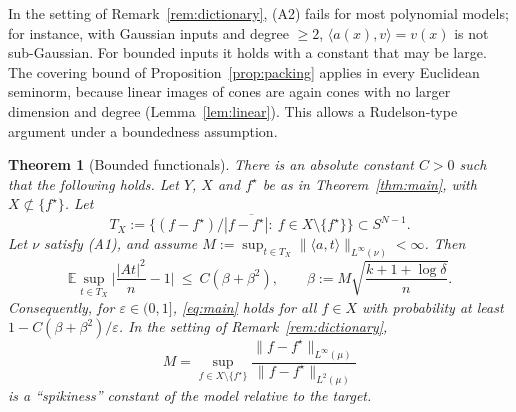 \documentclass[11pt]{article}
\newtheorem{theorem}{Theorem}[section]
\theoremstyle{definition}
\numberwithin{equation}{section}
\newcommand{\E}{\mathbb{E}}
\newcommand{\eps}{\varepsilon}
\newcommand{\fs}{f^{\star}}
\begin{document}
In the setting of Remark~\ref{rem:dictionary}, (A2) fails for most polynomial models; for instance, with Gaussian inputs and degree $\ge2$, $\langle a(x),v\rangle=v(x)$ is not sub-Gaussian. For bounded inputs it holds with a constant that may be large. The covering bound of Proposition~\ref{prop:packing} applies in every Euclidean seminorm, because linear images of cones are again cones with no larger dimension and degree (Lemma~\ref{lem:linear}). This allows a Rudelson-type argument under a boundedness assumption.

\begin{theorem}[Bounded functionals]\label{thm:bounded}
There is an absolute constant $C>0$ such that the following holds. Let $Y$, $X$ and $\fs$ be as in Theorem~\ref{thm:main}, with $X\not\subset\{\fs\}$. Let
\[
T_X:=\overline{\{(f-\fs)/|f-\fs|:\ f\in X\setminus\{\fs\}\}}\subset S^{N-1}.
\]
Let $\nu$ satisfy (A1), and assume $M:=\sup_{t\in T_X}\|\langle a,t\rangle\|_{L^\infty(\nu)}<\infty$. Then
\[
\E\sup_{t\in T_X}\Big|\frac{|At|^2}{n}-1\Big|\ \le\ C(\beta+\beta^2),\qquad\beta:=M\sqrt{\frac{k+1+\log\delta}{n}} .
\]
Consequently, for $\eps\in(0,1]$, \eqref{eq:main} holds for all $f\in X$ with probability at least $1-C(\beta+\beta^2)/\eps$. In the setting of Remark~\ref{rem:dictionary},
\[
M=\sup_{f\in X\setminus\{\fs\}}\frac{\|f-\fs\|_{L^\infty(\mu)}}{\|f-\fs\|_{L^2(\mu)}}
\]
is a ``spikiness'' constant of the model relative to the target.
\end{theorem}
\end{document}
